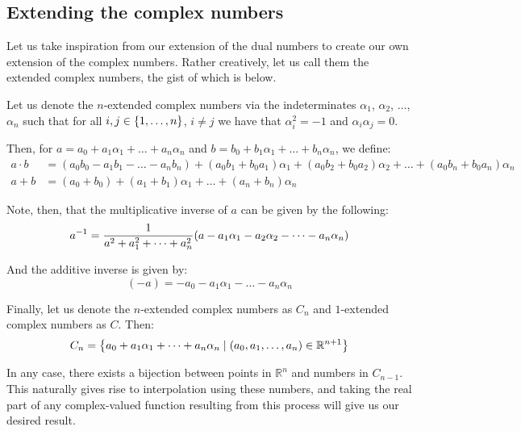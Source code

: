 \subsection{Extending the complex numbers}
Let us take inspiration from our extension of the dual numbers to create our own extension of the complex numbers. Rather creatively, let us call them the extended complex numbers, the gist of which is below.

Let us denote the $n$-extended complex numbers via the indeterminates $\alpha_1$, $\alpha_2$, $\dots$, $\alpha_n$ such that for all $i,j\in\br{1,\dots,n}$, $i\neq j$ we have that $\alpha_i^2=-1$ and $\alpha_i\alpha_j=0$.

Then, for $a=a_0+a_1\alpha_1+\dots+a_n\alpha_n$ and $b=b_0+b_1\alpha_1+\dots+b_n\alpha_n$, we define:
\begin{align*}
    a\cdot b &= (a_0b_0-a_1b_1-\dots-a_nb_n)+(a_0b_1+b_0a_1)\alpha_1+(a_0b_2+b_0a_2)\alpha_2+\dots+(a_0b_n+b_0a_n)\alpha_n \\
    a+b &= (a_0+b_0)+(a_1+b_1)\alpha_1+\dots+(a_n+b_n)\alpha_n
\end{align*}

Note, then, that the multiplicative inverse of $a$ can be given by the following:
$$
    a^{-1}=\frac{1}{a^2+a_1^2+\dots+a_n^2}\paren{a-a_1\alpha_1-a_2\alpha_2-\dots-a_n\alpha_n}
$$

And the additive inverse is given by:
$$
    (-a) = -a_0 - a_1\alpha_1 - \dots - a_n\alpha_n
$$

Finally, let us denote the $n$-extended complex numbers as $C_n$ and $1$-extended complex numbers as $C$. Then:
$$
    C_n = \br*{ a_0+a_1\alpha_1+\dots+a_n\alpha_n\mid (a_0,a_1,\dots,a_n)\in\mathbb{R}^{n+1} }
$$

In any case, there exists a bijection between points in $\mathbb{R}^n$ and numbers in $C_{n-1}$. This naturally gives rise to interpolation using these numbers, and taking the real part of any complex-valued function resulting from this process will give us our desired result.


